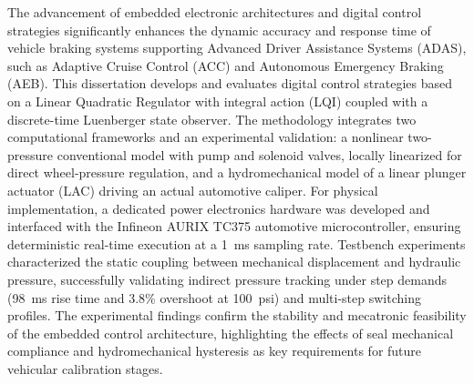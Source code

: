 \noindent The advancement of embedded electronic architectures and digital control strategies significantly enhances the dynamic accuracy and response time of vehicle braking systems supporting Advanced Driver Assistance Systems (ADAS), such as Adaptive Cruise Control (ACC) and Autonomous Emergency Braking (AEB). This dissertation develops and evaluates digital control strategies based on a Linear Quadratic Regulator with integral action (LQI) coupled with a discrete-time Luenberger state observer. The methodology integrates two computational frameworks and an experimental validation: a nonlinear two-pressure conventional model with pump and solenoid valves, locally linearized for direct wheel-pressure regulation, and a hydromechanical model of a linear plunger actuator (LAC) driving an actual automotive caliper. For physical implementation, a dedicated power electronics hardware was developed and interfaced with the Infineon AURIX TC375 automotive microcontroller, ensuring deterministic real-time execution at a 1~ms sampling rate. Testbench experiments characterized the static coupling between mechanical displacement and hydraulic pressure, successfully validating indirect pressure tracking under step demands (98~ms rise time and 3{.}8\% overshoot at 100~psi) and multi-step switching profiles. The experimental findings confirm the stability and mecatronic feasibility of the embedded control architecture, highlighting the effects of seal mechanical compliance and hydromechanical hysteresis as key requirements for future vehicular calibration stages.

\vspace{\baselineskip}
\noindent{}